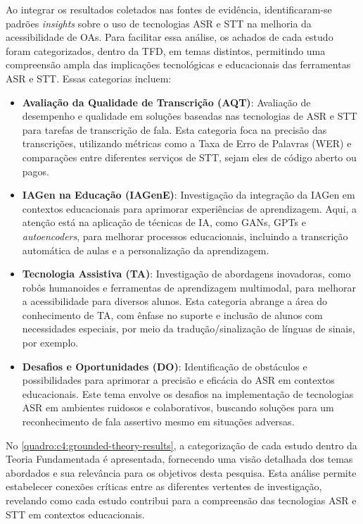 Ao integrar os resultados coletados nas fontes de evidência, identificaram-se padrões \textit{insights} sobre o uso de tecnologias ASR e STT na melhoria da acessibilidade de OAs. Para facilitar essa análise, os achados de cada estudo foram categorizados, dentro da TFD, em temas distintos, permitindo uma compreensão ampla das implicações tecnológicas e educacionais das ferramentas ASR e STT. Essas categorias incluem:

\begin{itemize}
\item \textbf{Avaliação da Qualidade de Transcrição (AQT)}: Avaliação de desempenho e qualidade em soluções baseadas nas tecnologias de ASR e STT para tarefas de transcrição de fala. Esta categoria foca na precisão das transcrições, utilizando métricas como a Taxa de Erro de Palavras (WER) e comparações entre diferentes serviços de STT, sejam eles de código aberto ou pagos.

\item \textbf{IAGen na Educação (IAGenE)}: Investigação da integração da IAGen em contextos educacionais para aprimorar experiências de aprendizagem. Aqui, a atenção está na aplicação de técnicas de IA, como GANs, GPTs e \textit{autoencoders}, para melhorar processos educacionais, incluindo a transcrição automática de aulas e a personalização da aprendizagem.

\item \textbf{Tecnologia Assistiva (TA)}: Investigação de abordagens inovadoras, como robôs humanoides e ferramentas de aprendizagem multimodal, para melhorar a acessibilidade para diversos alunos. Esta categoria abrange a área do conhecimento de TA, com ênfase no suporte e inclusão de alunos com necessidades especiais, por meio da tradução/sinalização de línguas de sinais, por exemplo.

\item \textbf{Desafios e Oportunidades (DO)}: Identificação de obstáculos e possibilidades para aprimorar a precisão e eficácia do ASR em contextos educacionais. Este tema envolve os desafios na implementação de tecnologias ASR em ambientes ruidosos e colaborativos, buscando soluções para um reconhecimento de fala assertivo mesmo em situações adversas.
\end{itemize}

No \autoref{quadro:c4:grounded-theory-results}, a categorização de cada estudo dentro da Teoria Fundamentada é apresentada, fornecendo uma visão detalhada dos temas abordados e sua relevância para os objetivos desta pesquisa. Esta análise permite estabelecer conexões críticas entre as diferentes vertentes de investigação, revelando como cada estudo contribui para a compreensão das tecnologias ASR e STT em contextos educacionais.

